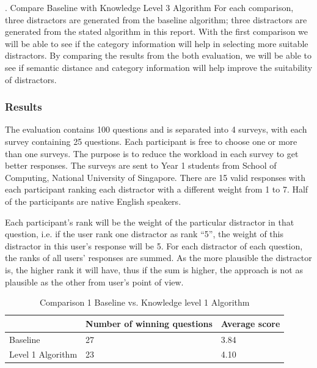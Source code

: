 .  Compare Baseline with Knowledge Level 3 Algorithm
For each comparison, three distractors are generated from the baseline algorithm; three distractors are generated from the stated algorithm in this report. With the first comparison we will be able to see if the category information will help in selecting more suitable distractors. By comparing the results from the both evaluation, we will be able to see if semantic distance and category information will help improve the suitability of distractors.

\subsubsection{Results}
The evaluation contains 100 questions and is separated into 4 surveys, with each survey containing 25 questions. Each participant is free to choose one or more than one surveys. The purpose is to reduce the workload in each survey to get better responses. The surveys are sent to Year 1 students from School of Computing, National University of Singapore.  There are 15 valid responses with each participant ranking each distractor with a different weight from 1 to 7. Half of the participants are native English speakers.


Each participant’s rank will be the weight of the particular distractor in that question, i.e. if the user rank one distractor as rank “5”, the weight of this distractor in this user’s response will be 5. For each distractor of each question, the ranks of all users’ responses are summed. As the more plausible the distractor is, the higher rank it will have, thus if the sum is higher, the approach is not as plausible as the other from user’s point of view.

\begin{table}[ht]
    \caption{Comparison 1 Baseline vs. Knowledge level 1 Algorithm}
    \label{table:distractor_1}
    \begin{center}
    \begin{tabular}{| p{1.5cm} | p{2.5cm} | p{2.2cm} |}
        \hline
         & Number of winning questions & Average score\\
        \hline
        Baseline & 27 & 3.84\\
        \hline
        Level 1 Algorithm & 23 & 4.10\\
        \hline
    \end{tabular}
    \end{center}
\end{table}

